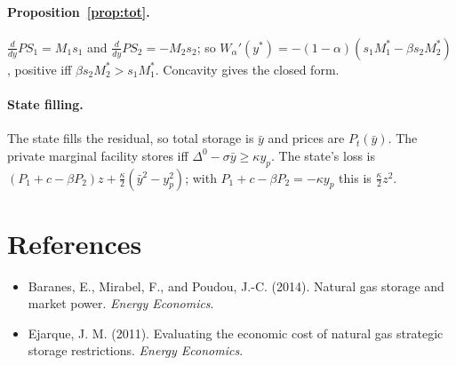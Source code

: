 \documentclass[11pt]{article}
\theoremstyle{definition}
\newcommand{\ybar}{\bar y}
\newcommand{\Dz}{\Delta^{0}}
\begin{document}
\paragraph{Proposition~\ref{prop:tot}.} $\frac{d}{dy}PS_1=M_1s_1$ and $\frac{d}{dy}PS_2=-M_2s_2$; so $W_\alpha'(y^*)=-(1-\alpha)(s_1M_1^*-\beta s_2M_2^*)$,
positive iff $\beta s_2M_2^*>s_1M_1^*$. Concavity gives the closed form.

\paragraph{State filling.} The state fills the residual, so total storage is $\ybar$ and prices are $P_t(\ybar)$. The private
marginal facility stores iff $\Dz-\sigma\ybar\ge\kappa y_p$. The state's loss is
$(P_1+c-\beta P_2)z+\frac\kappa2(\ybar^2-y_p^2)$; with $P_1+c-\beta P_2=-\kappa y_p$ this is $\frac\kappa2z^2$.

\section*{References}
\begin{itemize}[label={}]
\item Baranes, E., Mirabel, F., and Poudou, J.-C. (2014). Natural gas storage and market power. \emph{Energy Economics}.
\item Ejarque, J. M. (2011). Evaluating the economic cost of natural gas strategic storage restrictions. \emph{Energy Economics}.
\end{itemize}
\end{document}
